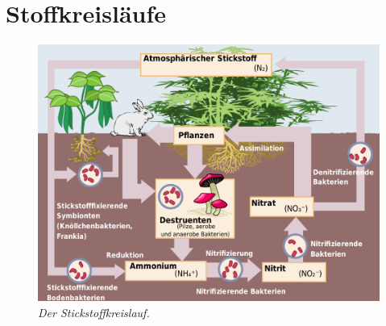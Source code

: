 
\section{Stoffkreisläufe}

\begin{figure}
	\leavevmode
	\begin{center}
	\includegraphics[scale=0.33]{./pictures/stickstoff_kl_1000}
	\end{center}
	\caption{\slshape{Der Stickstoffkreislauf.}}
	\label{fig:Duennfluessigkeitweggehen}
\end{figure}

